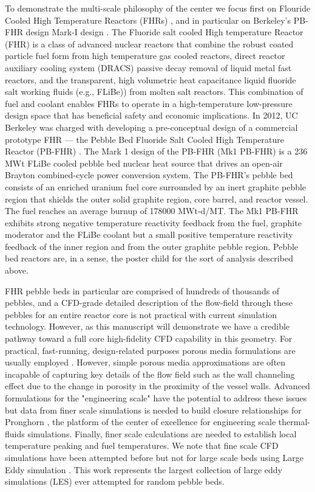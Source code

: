 To demonstrate the multi-scale philosophy of the center we focus first on Flouride Cooled High Temperature Reactors (FHRs) \cite{forsberg2015fluoride}, and in particular on Berkeley's PB-FHR design Mark-I design \cite{cisneros2014technical}. The Fluoride salt cooled High temperature Reactor (FHR) is a class of advanced nuclear reactors that combine the robust coated particle fuel form from high temperature gas cooled reactors, direct reactor auxiliary cooling system (DRACS) passive decay removal of liquid metal fast reactors, and the transparent, high volumetric heat capacitance liquid fluoride salt working fluids (e.g., FLiBe)) from molten salt reactors. This combination of fuel and coolant enables FHRs to operate in a high-temperature low-pressure design space that has beneficial safety and economic implications. In 2012, UC Berkeley was charged with developing a pre-conceptual design of a commercial prototype FHR --- the Pebble Bed Fluoride Salt Cooled High Temperature Reactor (PB-FHR) \cite{cisneros2014technical}. The Mark 1 design of the PB-FHR (Mk1 PB-FHR) is a 236 MWt FLiBe cooled pebble bed nuclear heat source that drives an open-air Brayton combined-cycle power conversion system. The PB-FHR's pebble bed consists of an enriched uranium fuel core surrounded by an inert graphite pebble region that shields the outer solid graphite region, core barrel, and reactor vessel. The fuel reaches an average burnup of 178000 MWt-d/MT. The Mk1 PB-FHR exhibits strong negative temperature reactivity feedback from the fuel, graphite moderator and the FLiBe coolant but a small positive temperature reactivity feedback of the inner region and from the outer graphite pebble region. Pebble bed reactors are, in a sense, the poster child for the sort of analysis described above.

FHR pebble beds in particular are comprised of hundreds of thousands of pebbles, and a CFD-grade detailed description of the flow-field through these pebbles for an entire reactor core is not practical with current simulation technology. However, as this manuscript will demonstrate we have a credible pathway toward a full core high-fidelity CFD capability in this geometry. For practical, fast-running, design-related purposes porous media formulations are usually employed  \cite{zou2017validation}. However, simple porous media approximations are often incapable of capturing key details of the flow field such as the wall channeling effect due to the change in porosity in the proximity of the vessel walls.  Advanced formulations for the "engineering scale" have the potential to address these issues but data from finer scale simulations is needed to build closure relationships for Pronghorn \cite{novak2018pronghorn}, the platform of the center of excellence for engineering scale thermal-fluids simulations. Finally, finer scale calculations are needed to establish local temperature peaking and fuel temperatures. We note that fine scale CFD simulations have been attempted before but not for large scale beds using Large Eddy simulation \cite{vanstaden2018}. This work represents the largest collection of  large eddy simulations  (LES) ever attempted for random pebble beds.

